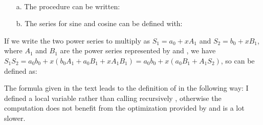 \begin{exe}[3.59]
    \ \vspace{-20pt}
    \begin{itemize}
	\item[a.] The procedure  can be written:
	\item[b.] The series for sine and cosine can be defined with:
    \end{itemize}
\end{exe}

\begin{exe}[3.60]
    If we write the two power series to multiply as $S_1 = a_0 + x A_1$ and $S_2 
    = b_0 + x B_1$, where $A_1$ and $B_1$ are the power series represented by
     and , we have
    $S_1 S_2 = a_0 b_0 + x (b_0 A_1 + a_0 B_1 + x A_1 B_1)
    = a_0 b_0 + x (a_0 B_1 + A_1 S_2)$, so  can be defined as:
\end{exe}

\begin{exe}[3.61]
    The formula given in the text leads to the definition of 
     in the following way:
    I defined a local variable rather than calling recursively 
    , otherwise the computation does not benefit from 
    the optimization provided by  and is a lot slower.
\end{exe}
